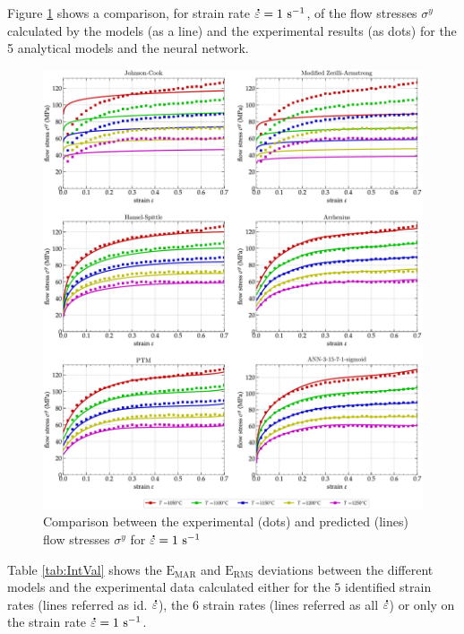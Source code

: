 \documentclass[metals,article,submit,pdftex,moreauthors]{Definitions/mdpi}
\DeclareRobustCommand{\mdot}[1]{\accentset{\mbox{\bfseries .}}{#1}}
\DeclareRobustCommand{\RMSE}{\text{E}_\text{RMS}}
\DeclareRobustCommand{\MARE}{\text{E}_\text{MAR}}
\DeclareRobustCommand{\ps}{\text{s}^{-1}}
\begin{document}
Figure \ref{fig:CompInt} shows a comparison, for strain rate $\mdot\varepsilon=1~\ps$, of the flow stresses $\sigma^y$ calculated by the models (as a line) and the experimental results (as dots) for the 5 analytical models and the neural network.
\begin{figure}[!ht]
\centering
\includegraphics[width=\columnwidth]
{Figures/CompInt}
\caption{Comparison between the experimental (dots) and predicted (lines) flow stresses $\sigma^y$ for $\mdot\varepsilon=1~\ps$}
\label{fig:CompInt}
\end{figure}
Table \ref{tab:IntVal} shows the $\MARE$ and $\RMSE$ deviations between the different models and the experimental data calculated either for the $5$ identified strain rates (lines referred as id. $\mdot\varepsilon$), the $6$ strain rates (lines referred as all $\mdot\varepsilon$) or only on the strain rate $\mdot\varepsilon=1~\ps$.
\end{document}
